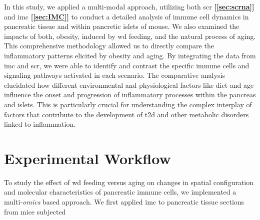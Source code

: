 \par  In this study, we applied a multi-modal approach, utilizing both \acrfull{scr} \textbf{[\autoref{sec:scrna}]} and \acrfull{imc} \textbf{[\autoref{sec:IMC}]} to conduct a detailed analysis of immune cell dynamics in pancreatic tissue and within pancretic islets of mouse. We also examined the impacts of both, obesity, induced by \gls{wd} feeding, and the natural process of aging. This comprehensive methodology allowed us to directly compare the inflammatory patterns elicited by obesity and aging. By integrating the data from \gls{imc} and \gls{scr}, we were able to identify and contrast the specific immune cells and signaling pathways activated in each scenario. The comparative analysis elucidated how different environmental and physiological factors like diet and age influence the onset and progression of inflammatory processes within the pancreas and islets. This is particularly crucial for understanding the complex interplay of factors that contribute to the development of \gls{t2d} and other metabolic disorders linked to inflammation.



\section{Experimental Workflow}
\label{sec:chp2_workflow}

To study the effect of \gls{wd} feeding versus aging on changes in spatial configuration and molecular characteristics of pancreatic immune cells, we implemented a multi\textit{-omics} based approach. We first applied \gls{imc} to pancreatic tissue sections from mice subjected 

